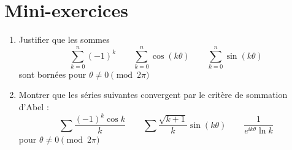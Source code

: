 \section{Mini-exercices}

\begin{frame}
\begin{miniexercice}
\begin{enumerate}
  \item Justifier que les sommes 
  $$
  \sum_{k=0}^n (-1)^k \qquad \sum_{k=0}^n \cos(k\theta) \qquad \sum_{k=0}^n \sin(k\theta)
  $$
  sont bornées pour $\theta \neq 0 \pmod{2\pi}$
 
  \item Montrer que les séries suivantes convergent par le critère de sommation d'Abel :
  $$\sum \frac{(-1)^k \cos k}{k} \qquad \sum \frac{\sqrt{k+1}}{k} \sin (k\theta)
  \qquad \frac{1}{e^{\ii k \theta}\ln k}$$
  pour $\theta \neq 0 \pmod{2\pi}$
\end{enumerate}
\end{miniexercice}
\end{frame}

